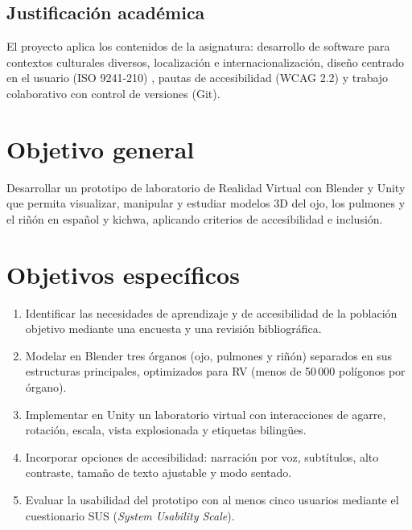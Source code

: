 \documentclass[11pt,a4paper]{article}
\begin{document}
\subsection*{Justificación académica}
El proyecto aplica los contenidos de la asignatura: desarrollo de software para contextos culturales diversos, localización e internacionalización, diseño centrado en el usuario (ISO 9241-210) \cite{iso9241}, pautas de accesibilidad (WCAG 2.2) \cite{wcag22} y trabajo colaborativo con control de versiones (Git).

\section{Objetivo general}
Desarrollar un prototipo de laboratorio de Realidad Virtual con Blender y Unity que permita visualizar, manipular y estudiar modelos 3D del ojo, los pulmones y el riñón en español y kichwa, aplicando criterios de accesibilidad e inclusión.

\section{Objetivos específicos}
\begin{enumerate}
    \item Identificar las necesidades de aprendizaje y de accesibilidad de la población objetivo mediante una encuesta y una revisión bibliográfica.
    \item Modelar en Blender tres órganos (ojo, pulmones y riñón) separados en sus estructuras principales, optimizados para RV (menos de 50\,000 polígonos por órgano).
    \item Implementar en Unity un laboratorio virtual con interacciones de agarre, rotación, escala, vista explosionada y etiquetas bilingües.
    \item Incorporar opciones de accesibilidad: narración por voz, subtítulos, alto contraste, tamaño de texto ajustable y modo sentado.
    \item Evaluar la usabilidad del prototipo con al menos cinco usuarios mediante el cuestionario SUS (\emph{System Usability Scale}).
\end{enumerate}

\end{document}
